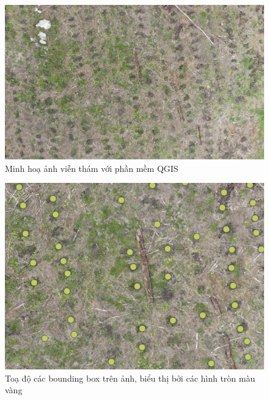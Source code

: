 \documentclass[a4paper, 12pt]{report}
\begin{document}
\begin{enumerate}[label= \textit{\alph*)}]
\newpage
 \begin{figure}[!htb]
	\centering
	\includegraphics[width=1\linewidth]{Images/qgisa}
	\caption{Minh hoạ ảnh viễn thám với phần mềm QGIS} 
	\label{fig:1a}
\end{figure}


 \begin{figure}[!htb]
	\centering
	\includegraphics[width=0.7\linewidth]{Images/qgisb}
	\caption{Toạ độ các bounding box trên ảnh,  biểu thị bởi các hình tròn màu vàng}
	\label{fig:1b}
\end{figure}




\end{enumerate}
\end{document}
